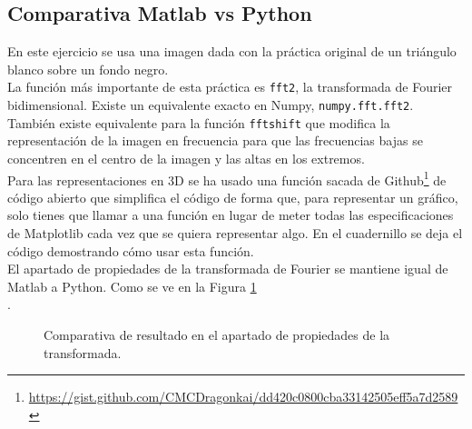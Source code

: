 \subsection{Comparativa Matlab vs Python}

En este ejercicio se usa una imagen dada con la práctica original de un triángulo blanco sobre un fondo negro.\\

La función más importante de esta práctica es \texttt{fft2}, la transformada de Fourier bidimensional. Existe un equivalente exacto en Numpy,  \texttt{numpy.fft.fft2}. También existe equivalente para la función \texttt{fftshift} que modifica la representación de la imagen en frecuencia para que las frecuencias bajas se concentren en el centro de la imagen y las altas en los extremos.\\

Para las representaciones en 3D se ha usado una función sacada de Github\footnote{\url{https://gist.github.com/CMCDragonkai/dd420c0800cba33142505eff5a7d2589
}} de código abierto que simplifica el código de forma que, para representar un gráfico, solo tienes que llamar a una función en lugar de meter todas las especificaciones de Matplotlib cada vez que se quiera representar algo. En el cuadernillo se deja el código demostrando cómo usar esta función.\\

El apartado de propiedades de la transformada de Fourier se mantiene igual de Matlab a Python. Como se ve en la Figura \ref{zoom}\\.

\begin{figure}[!tbp]
  \centering
  \hfill
  \caption{Comparativa de resultado en el apartado de propiedades de la transformada.}
  \label{zoom}
\end{figure}

